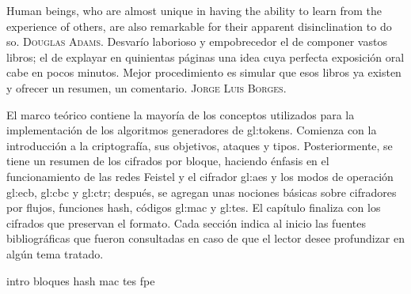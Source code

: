 %
%

{
  \epigrafe
  {%
    Human beings, who are almost unique in having the ability to learn from the
    experience of others, are also remarkable for their apparent disinclination
    to do so.%
  }
  {%
     \textsc{Douglas Adams}.%
  }
  \epigrafe
  {%
    Desvarío laborioso y empobrecedor el de componer vastos libros; el de
    explayar en quinientas páginas una idea cuya perfecta exposición oral cabe
    en pocos minutos. Mejor procedimiento es simular que esos libros ya existen
    y ofrecer un resumen, un comentario.%
  }
  {%
     \textsc{Jorge Luis Borges}.%
  }
}

\noindent
El marco teórico contiene la mayoría de los conceptos utilizados para la
implementación de los algoritmos generadores de \glspl{gl:token}. Comienza con
la introducción a la criptografía, sus objetivos, ataques y tipos.
Posteriormente, se tiene un resumen de los cifrados por bloque, haciendo énfasis
en el funcionamiento de las redes Feistel y el cifrador \gls{gl:aes} y los modos
de operación \gls{gl:ecb}, \gls{gl:cbc} y \gls{gl:ctr}; después, se agregan unas
nociones básicas sobre cifradores por flujos, funciones hash, códigos
\gls{gl:mac} y \gls{gl:tes}. El capítulo finaliza con los cifrados que preservan
el formato. Cada sección indica al inicio las fuentes bibliográficas que fueron
consultadas en caso de que el lector desee profundizar en algún tema tratado.

{intro}
{bloques}
{hash}
{mac}
{tes}
{fpe}
